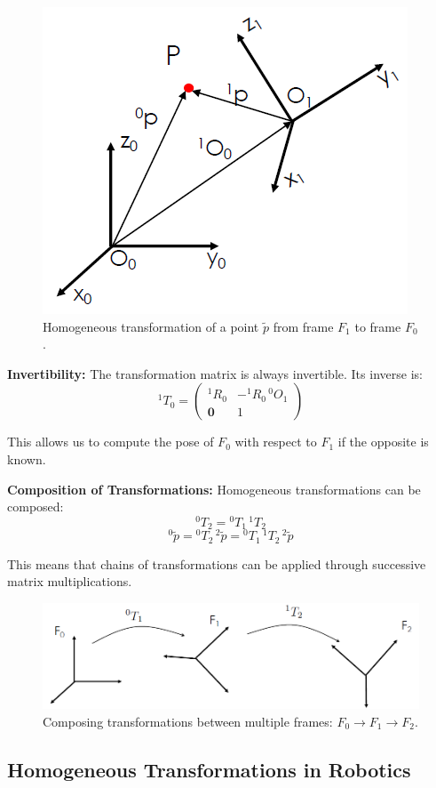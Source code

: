 \begin{figure}[H]
  \centering
  \includegraphics[width=0.5\linewidth]{imgs/homogeneous_point_position.png}
  \caption{Homogeneous transformation of a point $\tilde{p}$ from frame $F_1$ to frame $F_0$.}
\end{figure}

\textbf{Invertibility:}
The transformation matrix is always invertible. Its inverse is:
\[
{}^1\!T_0 =
\begin{pmatrix}
{}^1\!R_0 & -{}^1\!R_0\,{}^0\!O_1 \\
\mathbf{0} & 1
\end{pmatrix}
\]

This allows us to compute the pose of $F_0$ with respect to $F_1$ if the opposite is known.

\textbf{Composition of Transformations:}
Homogeneous transformations can be composed:
\[
{}^0\!T_2 = {}^0\!T_1\, {}^1\!T_2
\]
\[
{}^0\!\tilde{p} = {}^0\!T_2\, {}^2\!\tilde{p} = {}^0\!T_1\, {}^1\!T_2\, {}^2\!\tilde{p}
\]

This means that chains of transformations can be applied through successive matrix multiplications.

\begin{figure}[H]
  \centering
  \includegraphics[width=\linewidth]{imgs/homogeneous_chain_composition.png}
  \caption{Composing transformations between multiple frames: $F_0 \rightarrow F_1 \rightarrow F_2$.}
\end{figure}

\hfill

\subsection{Homogeneous Transformations in Robotics}

